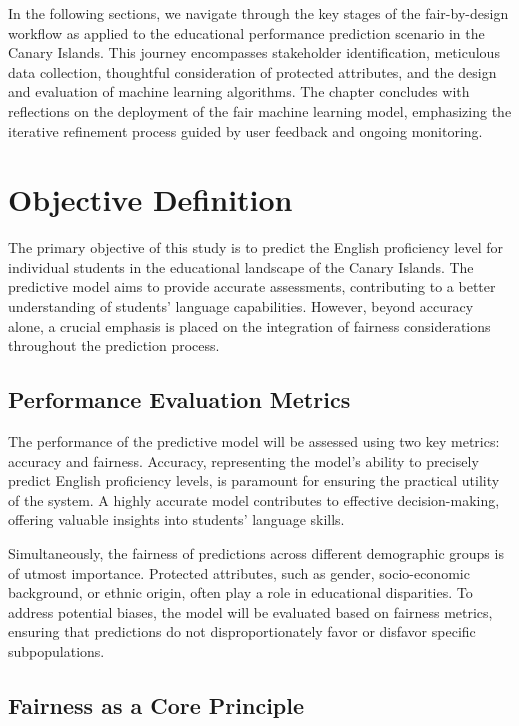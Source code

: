 \documentclass[12pt,a4paper,openright,twoside]{book}
\begin{document}
In the following sections, we navigate through the key stages of the fair-by-design workflow as applied to the educational performance prediction scenario in the Canary Islands. This journey encompasses stakeholder identification, meticulous data collection, thoughtful consideration of protected attributes, and the design and evaluation of machine learning algorithms. The chapter concludes with reflections on the deployment of the fair machine learning model, emphasizing the iterative refinement process guided by user feedback and ongoing monitoring.

\section{Objective Definition}

The primary objective of this study is to predict the English proficiency level for individual students in the educational landscape of the Canary Islands. The predictive model aims to provide accurate assessments, contributing to a better understanding of students' language capabilities. However, beyond accuracy alone, a crucial emphasis is placed on the integration of fairness considerations throughout the prediction process.

\subsection{Performance Evaluation Metrics}

The performance of the predictive model will be assessed using two key metrics: accuracy and fairness. Accuracy, representing the model's ability to precisely predict English proficiency levels, is paramount for ensuring the practical utility of the system. A highly accurate model contributes to effective decision-making, offering valuable insights into students' language skills.

Simultaneously, the fairness of predictions across different demographic groups is of utmost importance. Protected attributes, such as gender, socio-economic background, or ethnic origin, often play a role in educational disparities. To address potential biases, the model will be evaluated based on fairness metrics, ensuring that predictions do not disproportionately favor or disfavor specific subpopulations.

\subsection{Fairness as a Core Principle}
\end{document}
